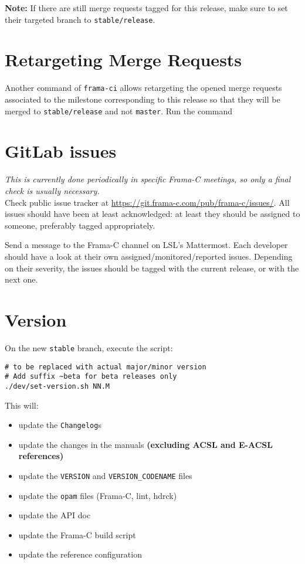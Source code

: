 \textbf{Note:} If there are still merge requests tagged for this release, make
sure to set their targeted branch to \texttt{stable/release}.

\section{Retargeting Merge Requests}
\label{sec:retarg-merge-requ}

Another command of \texttt{frama-ci} allows retargeting
the opened merge requests associated to the milestone corresponding
to this release so that they will be merged to \texttt{stable/release}
and not \texttt{master}. Run the command

\section{GitLab issues}
\label{sec:gitlab-issues}

{\em This is currently done periodically in specific Frama-C meetings, so only
  a final check is usually necessary.}~\\

Check public issue tracker at \url{https://git.frama-c.com/pub/frama-c/issues/}.
All issues should have been at least acknowledged: at least they should be
assigned to someone, preferably tagged appropriately.

Send a message to the Frama-C channel on LSL's Mattermost. Each developer should
have a look at their own assigned/monitored/reported issues. Depending on their
severity, the issues should be tagged with the current release, or with the next
one.

\section{Version}
\label{sec:version}

On the new \texttt{stable} branch, execute the script:
\begin{verbatim}
# to be replaced with actual major/minor version
# Add suffix ~beta for beta releases only
./dev/set-version.sh NN.M
\end{verbatim}

This will:
\begin{itemize}
  \item update the \texttt{Changelog}s
  \item update the changes in the manuals \textbf{(excluding ACSL and E-ACSL references)}
  \item update the \texttt{VERSION} and \texttt{VERSION\_CODENAME} files
  \item update the \texttt{opam} files (Frama-C, lint, hdrck)
  \item update the API doc
  \item update the Frama-C build script
  \item update the reference configuration
\end{itemize}

